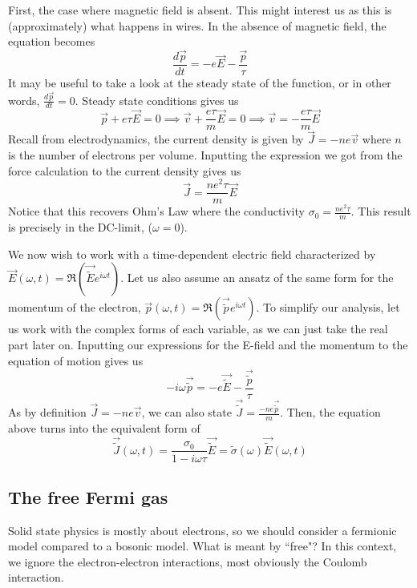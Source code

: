 \documentclass[12pt]{article}
\begin{document}
\newpage

First, the case where magnetic field is absent. This might interest us as this is (approximately) what happens in wires. In the absence of magnetic field, the equation becomes
\begin{equation*}
    \frac{d\vec{p}}{dt}=-e\vec{E}-\frac{\vec{p}}{\tau}
\end{equation*}
It may be useful to take a look at the steady state of the function, or in other words, $\frac{d\vec{p}}{dt}=0$. Steady state conditions gives us
\begin{equation*}
    \vec{p}+e\tau\vec{E}=0\implies \vec{v}+\frac{e\tau}{m}\vec{E}=0\implies \vec{v}=-\frac{e\tau}{m}\vec{E}
\end{equation*}
Recall from electrodynamics, the current density is given by $\vec{J}=-ne\vec{v}$ where $n$ is the number of electrons per volume. Inputting the expression we got from the force calculation to the current density gives us
\begin{equation*}
    \vec{J}=\frac{ne^2\tau}{m}\vec{E}
\end{equation*}
Notice that this recovers Ohm's Law where the conductivity $\sigma_0=\frac{ne^2\tau}{m}$. This result is precisely in the DC-limit, ($\omega=0$).

\vspace{0.25 in}

We now wish to work with a time-dependent electric field characterized by $\vec{E}(\omega,t)=\Re(\vec{\tilde{E}}e^{i\omega t})$. Let us also assume an ansatz of the same form for the momentum of the electron,  $\vec{p}(\omega,t)=\Re(\vec{\tilde{p}}e^{i\omega t})$. To simplify our analysis, let us work with the complex forms of each variable, as we can just take the real part later on. Inputting our expressions for the E-field and the momentum to the equation of motion gives us
\begin{equation*}
    -i\omega \vec{\tilde{p}}=-e\vec{\tilde{E}}-\frac{\vec{\tilde{p}}}{\tau}
\end{equation*}
As by definition $\vec{J}=-ne\vec{v}$, we can also state $\vec{\tilde{J}}=\frac{-ne\vec{\tilde{p}}}{m}$. Then, the equation above turns into the equivalent form of
\begin{equation*}
    \vec{\tilde{J}}(\omega,t)=\frac{\sigma_0}{1-i\omega\tau}\vec{\tilde{E}}=\tilde{\sigma}(\omega)\vec{\tilde{E}}(\omega,t)
\end{equation*}


\newpage

\subsection{The free Fermi gas}
Solid state physics is mostly about electrons, so we should consider a fermionic model compared to a bosonic model. What is meant by ``free"? In this context, we ignore the electron-electron interactions, most obviously the Coulomb interaction. 
\end{document}
